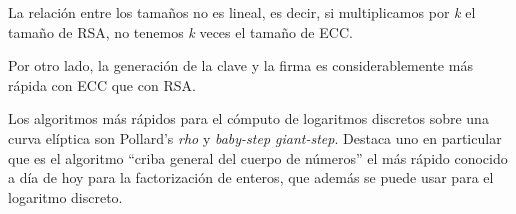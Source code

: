 \documentclass[11pt]{article}
\begin{document}
La relación entre los tamaños no es lineal, es decir, si multiplicamos por \textit{k} el tamaño de RSA, no tenemos \textit{k} veces el tamaño de ECC.

Por otro lado, la generación de la clave y la firma es considerablemente más rápida con ECC que con RSA.

Los algoritmos más rápidos para el cómputo de logaritmos discretos sobre una curva elíptica son Pollard's \textit{rho} y \textit{baby-step giant-step}. Destaca uno en particular que es el algoritmo ``criba general del cuerpo de números'' el más rápido conocido a día de hoy para la factorización de enteros, que además se puede usar para el logaritmo discreto.


\newpage
\nocite{*}
\end{document}
